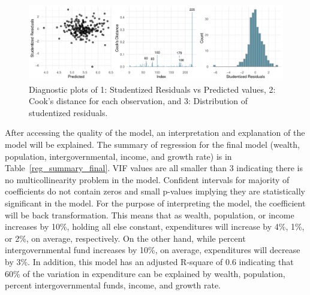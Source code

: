\documentclass[11pt]{article}\usepackage[]{graphicx}\usepackage[]{color}
\makeatletter
\def\maxwidth{ %
  \ifdim\Gin@nat@width>\linewidth
    \linewidth
  \else
    \Gin@nat@width
  \fi
}
\makeatother
\begin{document}
\begin{figure}[h!] 
\begin{center}

\includegraphics[width=\maxwidth]{figure/unnamed-chunk-5-1} 

\caption{Diagnostic plots of 1: Studentized Residuals vs Predicted values, 2: Cook's distance for each observation, and 3: Distribution of studentized residuals.}
\label{diag-plot1}
\end{center} 
\end{figure}

\noindent After accessing the quality of the model, an interpretation and explanation of the model will be explained. The summary of regression for the final model (wealth, population, intergovernmental, income, and growth rate) is in Table~\ref{reg_summary_final}. VIF values are all smaller than 3 indicating there is no multicollinearity problem in the model. Confident intervals for majority of coefficients do not contain zeros and small p-values implying they are statistically significant in the model. For the purpose of interpreting the model, the coefficient will be back transformation. This means that as wealth, population, or income increases by 10\%, holding all else constant, expenditures will increase by 4\%, 1\%, or 2\%, on average, respectively. On the other hand, while percent intergovernmental fund increases by 10\%, on average, expenditures will decrease by 3\%. In addition, this model has an adjusted R-square of 0.6 indicating that 60\% of the variation in expenditure can be explained by wealth, population, percent intergovernmental funds, income, and growth rate.   
\end{document}
